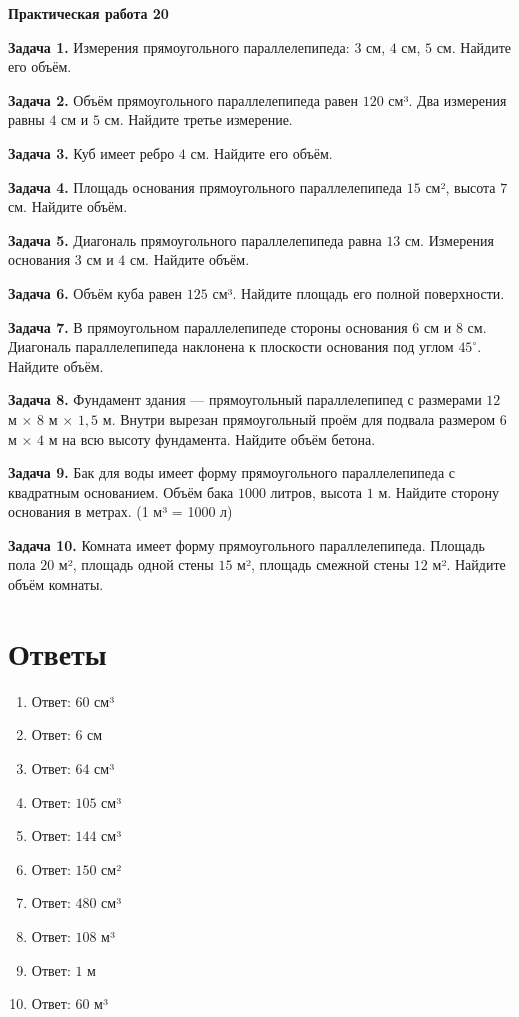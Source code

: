 \documentclass{umk-matematika}
\begin{document}
\begin{center}
{\Large\bfseries Практическая работа 20}
\end{center}
\vspace{0.5cm}

\textbf{Задача 1.} Измерения прямоугольного параллелепипеда: $3$ см, $4$ см, $5$ см. Найдите его объём.\par\vspace{10pt}
\textbf{Задача 2.} Объём прямоугольного параллелепипеда равен $120$ см³. Два измерения равны $4$ см и $5$ см. Найдите третье измерение.\par\vspace{10pt}
\textbf{Задача 3.} Куб имеет ребро $4$ см. Найдите его объём.\par\vspace{10pt}
\textbf{Задача 4.} Площадь основания прямоугольного параллелепипеда $15$ см², высота $7$ см. Найдите объём.\par\vspace{10pt}
\textbf{Задача 5.} Диагональ прямоугольного параллелепипеда равна $13$ см. Измерения основания $3$ см и $4$ см. Найдите объём.\par\vspace{10pt}
\textbf{Задача 6.} Объём куба равен $125$ см³. Найдите площадь его полной поверхности.\par\vspace{10pt}
\textbf{Задача 7.} В прямоугольном параллелепипеде стороны основания $6$ см и $8$ см. Диагональ параллелепипеда наклонена к плоскости основания под углом $45^\circ$. Найдите объём.\par\vspace{10pt}
\textbf{Задача 8.} Фундамент здания — прямоугольный параллелепипед с размерами $12$ м $\times$ $8$ м $\times$ $1{,}5$ м. Внутри вырезан прямоугольный проём для подвала размером $6$ м $\times$ $4$ м на всю высоту фундамента. Найдите объём бетона.\par\vspace{10pt}
\textbf{Задача 9.} Бак для воды имеет форму прямоугольного параллелепипеда с квадратным основанием. Объём бака $1000$ литров, высота $1$ м. Найдите сторону основания в метрах. (1 м³ = 1000 л)\par\vspace{10pt}
\textbf{Задача 10.} Комната имеет форму прямоугольного параллелепипеда. Площадь пола $20$ м², площадь одной стены $15$ м², площадь смежной стены $12$ м². Найдите объём комнаты.\par\vspace{10pt}
\newpage
\section*{Ответы}

\begin{enumerate}
  \item Ответ: $60$ см³
  \item Ответ: $6$ см
  \item Ответ: $64$ см³
  \item Ответ: $105$ см³
  \item Ответ: $144$ см³
  \item Ответ: $150$ см²
  \item Ответ: $480$ см³
  \item Ответ: $108$ м³
  \item Ответ: $1$ м
  \item Ответ: $60$ м³
\end{enumerate}
\end{document}
